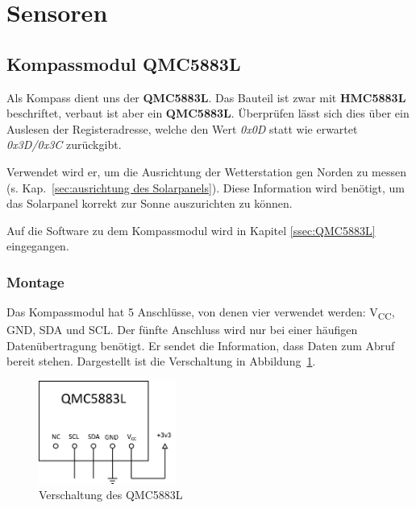 \pagebreak
\section{Sensoren}\label{sec:Sensoren}




\subsection{Kompassmodul QMC5883L}
Als Kompass dient uns der \textbf{QMC5883L}. Das Bauteil ist zwar mit \textbf{HMC5883L} beschriftet, verbaut ist aber ein \textbf{QMC5883L}. Überprüfen lässt sich dies über ein Auslesen der Registeradresse, welche den Wert \textit{0x0D} statt wie erwartet \textit{0x3D/0x3C} zurückgibt.

Verwendet wird er, um die Ausrichtung der Wetterstation gen Norden zu messen (s. Kap.~\ref{sec:ausrichtung des Solarpanels}). Diese Information wird benötigt, um das Solarpanel korrekt zur Sonne auszurichten zu können. 

Auf die Software zu dem Kompassmodul wird in Kapitel \ref{ssec:QMC5883L} eingegangen.

\subsubsection{Montage}
Das Kompassmodul hat 5 Anschlüsse, von denen vier verwendet werden: V\textsubscript{CC}, GND, SDA und SCL. Der fünfte Anschluss wird nur bei einer häufigen Datenübertragung benötigt. Er sendet die Information, dass Daten zum Abruf bereit stehen. Dargestellt ist die Verschaltung in Abbildung~\ref{fig:QMC5883L_Plan}.

\begin{figure}[H]
  \centering
  \includegraphics[width=0.4\textwidth]{./img/QMC5883L_Plan.png}
  \caption{Verschaltung des QMC5883L}\label{fig:QMC5883L_Plan}
\end{figure}

